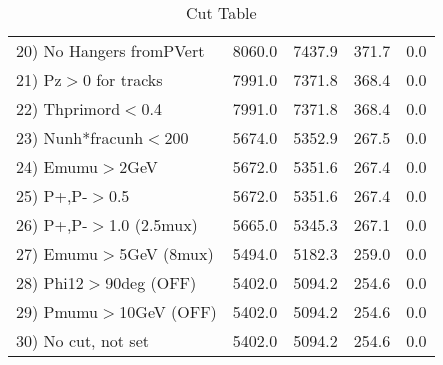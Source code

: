 \begin{table}[h!]
\begin{tabular}{||l||r|r|r|r||}
 20) No Hangers fromPVert &      8060.0 &      7437.9 &       371.7 &         0.0 \\
 21) Pz$>$0 for tracks    &      7991.0 &      7371.8 &       368.4 &         0.0 \\
 22) Thprimord$<$0.4      &      7991.0 &      7371.8 &       368.4 &         0.0 \\
 23) Nunh*fracunh$<$200   &      5674.0 &      5352.9 &       267.5 &         0.0 \\
 24) Emumu$>$2GeV         &      5672.0 &      5351.6 &       267.4 &         0.0 \\
 25) P+,P-$>$0.5          &      5672.0 &      5351.6 &       267.4 &         0.0 \\
 26) P+,P-$>$1.0 (2.5mux) &      5665.0 &      5345.3 &       267.1 &         0.0 \\
 27) Emumu$>$5GeV  (8mux) &      5494.0 &      5182.3 &       259.0 &         0.0 \\
 28) Phi12$>$90deg  (OFF) &      5402.0 &      5094.2 &       254.6 &         0.0 \\
 29) Pmumu$>$10GeV  (OFF) &      5402.0 &      5094.2 &       254.6 &         0.0 \\
 30) No cut, not set      &      5402.0 &      5094.2 &       254.6 &         0.0 \\
 \hline
 \hline
 \end{tabular}
 \caption{Cut Table \cohrp  }
 \label{tab-cut_crhop}
 \end{table}

